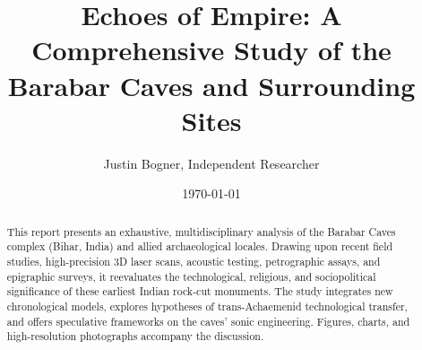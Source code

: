 \documentclass{article}
\title{Echoes of Empire: A Comprehensive Study of the Barabar Caves and Surrounding Sites}
\author[1]{Justin Bogner, Independent Researcher}
\affil[1]{Pelicans Perspective}
\date{\today}
\begin{document}
\maketitle
\begin{abstract}
This report presents an exhaustive, multidisciplinary analysis of the Barabar Caves complex (Bihar, India) and allied archaeological locales. Drawing upon recent field studies, high-precision 3D laser scans, acoustic testing, petrographic assays, and epigraphic surveys, it reevaluates the technological, religious, and sociopolitical significance of these earliest Indian rock-cut monuments. The study integrates new chronological models, explores hypotheses of trans-Achaemenid technological transfer, and offers speculative frameworks on the caves’ sonic engineering. Figures, charts, and high-resolution photographs accompany the discussion.\end{abstract}
\end{document}

